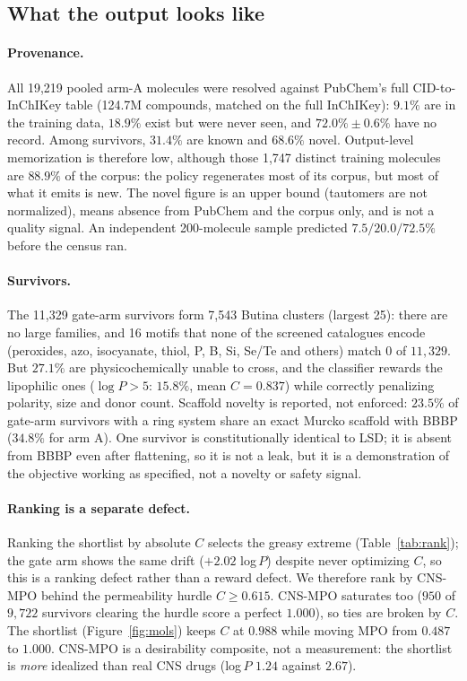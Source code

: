 \documentclass[10pt,letterpaper]{article}
\begin{document}
\subsection{What the output looks like}
\paragraph{Provenance.} All 19{,}219 pooled arm-A molecules were resolved against PubChem's full CID-to-InChIKey table (124.7M compounds, matched on the full InChIKey): $9.1\%$ are in the training data, $18.9\%$ exist but were never seen, and $72.0\%\pm0.6\%$ have no record. Among survivors, $31.4\%$ are known and $68.6\%$ novel. Output-level memorization is therefore low, although those 1{,}747 distinct training molecules are $88.9\%$ of the corpus: the policy regenerates most of its corpus, but most of what it emits is new. The novel figure is an upper bound (tautomers are not normalized), means absence from PubChem and the corpus only, and is not a quality signal. An independent 200-molecule sample predicted $7.5/20.0/72.5\%$ before the census ran.

\paragraph{Survivors.} The 11{,}329 gate-arm survivors form 7{,}543 Butina clusters (largest 25): there are no large families, and 16 motifs that none of the screened catalogues encode (peroxides, azo, isocyanate, thiol, P, B, Si, Se/Te and others) match $0$ of $11{,}329$. But $27.1\%$ are physicochemically unable to cross, and the classifier rewards the lipophilic ones ($\log P>5$: $15.8\%$, mean $C=0.837$) while correctly penalizing polarity, size and donor count. Scaffold novelty is reported, not enforced: $23.5\%$ of gate-arm survivors with a ring system share an exact Murcko scaffold with BBBP ($34.8\%$ for arm A). One survivor is constitutionally identical to LSD; it is absent from BBBP even after flattening, so it is not a leak, but it is a demonstration of the objective working as specified, not a novelty or safety signal.

\paragraph{Ranking is a separate defect.} Ranking the shortlist by absolute $C$ selects the greasy extreme (Table~\ref{tab:rank}); the gate arm shows the same drift ($+2.02$ log\,$P$) despite never optimizing $C$, so this is a ranking defect rather than a reward defect. We therefore rank by CNS-MPO \cite{wager2010} behind the permeability hurdle $C\ge0.615$. CNS-MPO saturates too ($950$ of $9{,}722$ survivors clearing the hurdle score a perfect $1.000$), so ties are broken by $C$. The shortlist (Figure~\ref{fig:mols}) keeps $C$ at $0.988$ while moving MPO from $0.487$ to $1.000$. CNS-MPO is a desirability composite, not a measurement: the shortlist is \emph{more} idealized than real CNS drugs (log\,$P$ $1.24$ against $2.67$).
\end{document}
